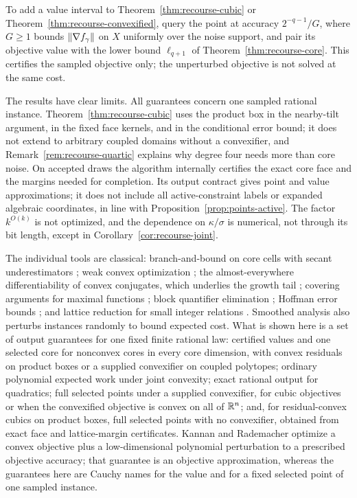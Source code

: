 \begin{remark}
\label{rem:recourse-value-certificate}
To add a value interval to Theorem~\ref{thm:recourse-cubic} or
Theorem~\ref{thm:recourse-convexified}, query the point at accuracy
$2^{-q-1}/G$, where $G\ge1$ bounds $\left\lVert\nabla f_\gamma\right\rVert$ on $X$
uniformly over the noise support, and pair its objective value with the
lower bound $\ell_{q+1}$ of Theorem~\ref{thm:recourse-core}. This
certifies the sampled objective only; the unperturbed objective is not
solved at the same cost.
\end{remark}

The results have clear limits. All guarantees concern one sampled
rational instance. Theorem~\ref{thm:recourse-cubic} uses the product box
in the nearby-tilt argument, in the fixed face kernels, and in the
conditional error bound; it does not extend to arbitrary coupled
domains without a convexifier, and Remark~\ref{rem:recourse-quartic}
explains why degree four needs more than core noise. On accepted draws the
algorithm internally certifies the exact core face and the margins needed
for completion. Its output contract gives point and value approximations;
it does not include all active-constraint labels or expanded algebraic
coordinates, in line with Proposition~\ref{prop:points-active}.
The factor $k^{O(k)}$ is not
optimized, and the dependence on $\kappa/\sigma$ is numerical, not
through its bit length, except in Corollary~\ref{cor:recourse-joint}.

The individual tools are classical: branch-and-bound on core cells with
secant underestimators \citep{AndroulakisMaranasFloudas1995}; weak
convex optimization \citep{GroetschelLovaszSchrijver1988}; the
almost-everywhere differentiability of convex conjugates, which
underlies the growth tail \citep{Rockafellar1970}; covering arguments
for maximal functions \citep{EvansGariepy2015}; block quantifier
elimination \citep{Renegar1992QE,BasuPollackRoy2006}; Hoffman error
bounds \citep{Hoffman1952}; and lattice reduction for small integer
relations \citep{LenstraLenstraLovasz1982}. Smoothed analysis
\citep{SpielmanTeng2004} also perturbs instances randomly to bound
expected cost. What is shown here is a set of output guarantees for one
fixed finite rational law: certified values and one selected core for
nonconvex cores in every core dimension, with convex residuals on
product boxes or a supplied convexifier on coupled polytopes;
ordinary polynomial expected work under joint convexity; exact rational
output for quadratics; full selected points under a supplied
convexifier, for cubic objectives or when the convexified objective is
convex on all of $\mathbb R^n$; and, for residual-convex cubics on product
boxes, full selected points with no convexifier, obtained from exact
face and lattice-margin certificates. Kannan and Rademacher optimize a convex
objective plus a low-dimensional polynomial perturbation
\citep{KannanRademacher2009} to a
prescribed objective accuracy; that guarantee is an objective
approximation, whereas the guarantees here are Cauchy names for the value
and for a fixed selected point of one sampled instance.

